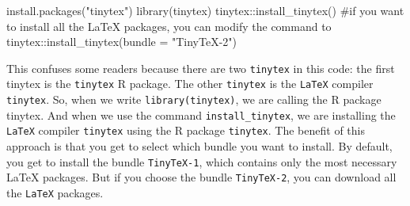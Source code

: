 \documentclass[
  letterpaper,
  twoside,
  openright,
  headsepline,
  footsepline,
  listof = totocnumbered,
  chapterprefix = true,
  titlepage = false]{scrbook}
\newenvironment{Shaded}{\begin{snugshade}}{\end{snugshade}}
\newcommand{\CommentTok}[1]{\textcolor[rgb]{0.37,0.37,0.37}{#1}}
\newcommand{\FunctionTok}[1]{\textcolor[rgb]{0.28,0.35,0.67}{#1}}
\newcommand{\NormalTok}[1]{\textcolor[rgb]{0.00,0.23,0.31}{#1}}
\newcommand{\SpecialCharTok}[1]{\textcolor[rgb]{0.37,0.37,0.37}{#1}}
\newcommand{\StringTok}[1]{\textcolor[rgb]{0.13,0.47,0.30}{#1}}
\begin{document}
\begin{Shaded}
\begin{Highlighting}[numbers=left,,]
\FunctionTok{install.packages}\NormalTok{(}\StringTok{"tinytex"}\NormalTok{)}
\FunctionTok{library}\NormalTok{(tinytex)}
\NormalTok{tinytex}\SpecialCharTok{::}\FunctionTok{install\_tinytex}\NormalTok{()}
\CommentTok{\#if you want to install all the LaTeX packages, you can modify the command to tinytex::install\_tinytex(bundle = "TinyTeX{-}2")}
\end{Highlighting}
\end{Shaded}

This confuses some readers because there are two \texttt{tinytex} in
this code: the first tinytex is the \texttt{tinytex} R package. The
other \texttt{tinytex} is the \texttt{LaTeX} compiler \texttt{tinytex}.
So, when we write \texttt{library(tinytex)}, we are calling the R
package tinytex. And when we use the command \texttt{install\_tinytex},
we are installing the \texttt{LaTeX} compiler \texttt{tinytex} using the
R package \texttt{tinytex}. The benefit of this approach is that you get
to select which bundle you want to install. By default, you get to
install the bundle \texttt{TinyTeX-1}, which contains only the most
necessary LaTeX packages. But if you choose the bundle
\texttt{TinyTeX-2}, you can download all the \texttt{LaTeX} packages.


\backmatter
\end{document}
